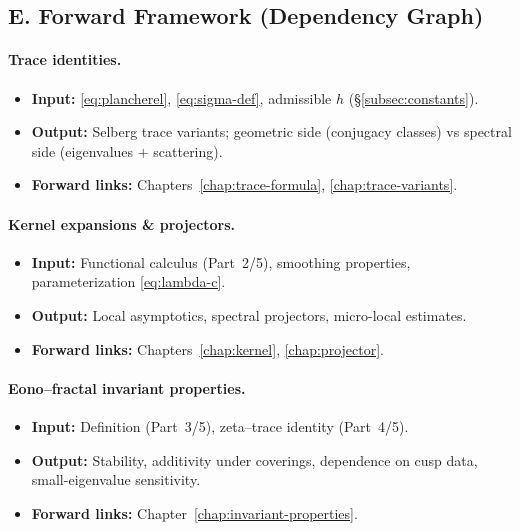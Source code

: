 
\subsection*{E. Forward Framework (Dependency Graph)}
\label{subsec:forward}

\paragraph{Trace identities.}
\begin{itemize}
  \item \textbf{Input:} \eqref{eq:plancherel}, \eqref{eq:sigma-def}, admissible $h$ (\S\ref{subsec:constants}).
  \item \textbf{Output:} Selberg trace variants; geometric side (conjugacy classes) vs spectral side (eigenvalues $+$ scattering).
  \item \textbf{Forward links:} Chapters~\ref{chap:trace-formula}, \ref{chap:trace-variants}.
\end{itemize}

\paragraph{Kernel expansions \& projectors.}
\begin{itemize}
  \item \textbf{Input:} Functional calculus (Part~2/5), smoothing properties, parameterization \eqref{eq:lambda-c}.
  \item \textbf{Output:} Local asymptotics, spectral projectors, micro-local estimates.
  \item \textbf{Forward links:} Chapters~\ref{chap:kernel}, \ref{chap:projector}.
\end{itemize}

\paragraph{Eono–fractal invariant properties.}
\begin{itemize}
  \item \textbf{Input:} Definition (Part~3/5), zeta–trace identity (Part~4/5).
  \item \textbf{Output:} Stability, additivity under coverings, dependence on cusp data, small-eigenvalue sensitivity.
  \item \textbf{Forward links:} Chapter~\ref{chap:invariant-properties}.
\end{itemize}

